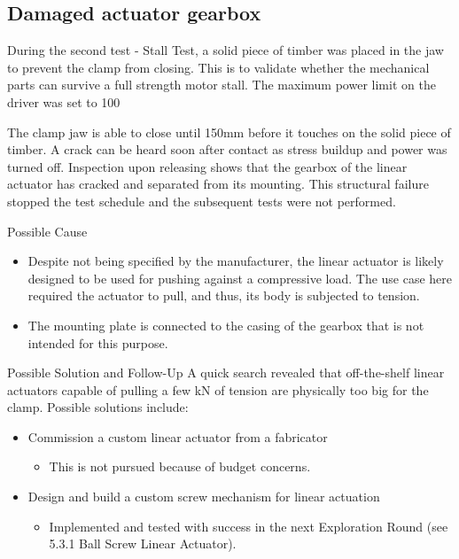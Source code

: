 \subsection{Damaged actuator gearbox}
\label{subsection:exploration_1_damaged_actuator_gearbox}

During the second test - Stall Test, a solid piece of timber was placed in the jaw to prevent the clamp from closing. This is to validate whether the mechanical parts can survive a full strength motor stall. The maximum power limit on the driver was set to 100%

The clamp jaw is able to close until 150mm before it touches on the solid piece of timber. A crack can be heard soon after contact as stress buildup and power was turned off. Inspection upon releasing shows that the gearbox of the linear actuator has cracked and separated from its mounting. This structural failure stopped the test schedule and the subsequent tests were not performed.

Possible Cause
\begin{itemize}
    \item Despite not being specified by the manufacturer, the linear actuator is likely designed to be used for pushing against a compressive load. The use case here required the actuator to pull, and thus, its body is subjected to tension. 
    \item The mounting plate is connected to the casing of the gearbox that is not intended for this purpose.
\end{itemize}

    Possible Solution and Follow-Up
A quick search revealed that off-the-shelf linear actuators capable of pulling a few kN of tension are physically too big for the clamp. Possible solutions include:
\begin{itemize}
    \item Commission a custom linear actuator from a fabricator
    \begin{itemize}
        \item This is not pursued because of budget concerns.
    \end{itemize}
    \item Design and build a custom screw mechanism for linear actuation
    \begin{itemize}
        \item Implemented and tested with success in the next Exploration Round (see 5.3.1 Ball Screw Linear Actuator). 
    \end{itemize}
\end{itemize}

